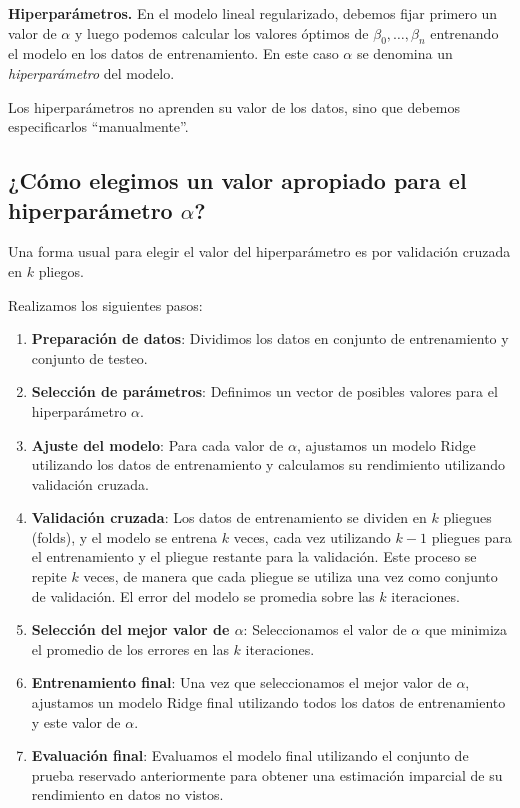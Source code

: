 \documentclass[a4paper]{article}
\begin{document}
\textbf{Hiperparámetros.} En el modelo lineal regularizado, debemos fijar primero un valor de $\alpha$ y luego podemos calcular los valores óptimos de $\beta_0, \dots, \beta_n$ entrenando el modelo en los datos de entrenamiento. En este caso $\alpha$ se denomina un \emph{hiperparámetro} del modelo.

Los hiperparámetros no aprenden su valor de los datos, sino que debemos especificarlos ``manualmente''.

\subsection{¿Cómo elegimos un valor apropiado para el hiperparámetro $\alpha$?}

Una forma usual para elegir el valor del hiperparámetro es por validación cruzada en $k$ pliegos.

Realizamos los siguientes pasos:

\begin{enumerate}
\item \textbf{Preparación de datos}: Dividimos los datos en conjunto de entrenamiento y conjunto de testeo.

\item \textbf{Selección de parámetros}: Definimos un vector de posibles valores para el hiperparámetro $\alpha$.

\item \textbf{Ajuste del modelo}: Para cada valor de $\alpha$, ajustamos un modelo Ridge utilizando los datos de entrenamiento y calculamos su rendimiento utilizando validación cruzada.

\item \textbf{Validación cruzada}: Los datos de entrenamiento se dividen en $k$ pliegues (folds), y el modelo se entrena $k$ veces, cada vez utilizando $k-1$ pliegues para el entrenamiento y el pliegue restante para la validación. Este proceso se repite $k$ veces, de manera que cada pliegue se utiliza una vez como conjunto de validación. El error del modelo se promedia sobre las $k$ iteraciones.

\item \textbf{Selección del mejor valor de $\alpha$}: Seleccionamos el valor de $\alpha$ que minimiza el promedio de los errores en las $k$ iteraciones.

\item \textbf{Entrenamiento final}: Una vez que seleccionamos el mejor valor de $\alpha$, ajustamos un modelo Ridge final utilizando todos los datos de entrenamiento y este valor de $\alpha$.

\item \textbf{Evaluación final}: Evaluamos el modelo final utilizando el conjunto de prueba reservado anteriormente para obtener una estimación imparcial de su rendimiento en datos no vistos.
\end{enumerate}
\end{document}

